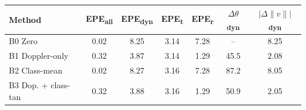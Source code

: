 \begin{tabular}{lcccccc}
\toprule
Method & EPE\textsubscript{all} & EPE\textsubscript{dyn} & \textbf{EPE\textsubscript{t}} & EPE\textsubscript{r} & $\Delta\theta$\textsubscript{dyn} & $|\Delta\|v\||$\textsubscript{dyn} \\
\midrule
B0 Zero & 0.02 & 8.25 & 3.14 & 7.28 & -- & 8.25 \\
B1 Doppler-only & 0.32 & 3.87 & 3.14 & 1.29 & 45.5 & 2.08 \\
B2 Class-mean & 0.02 & 8.27 & 3.16 & 7.28 & 87.2 & 8.05 \\
B3 Dop. + class-tan & 0.32 & 3.88 & 3.16 & 1.29 & 50.9 & 2.05 \\
\bottomrule
\end{tabular}
